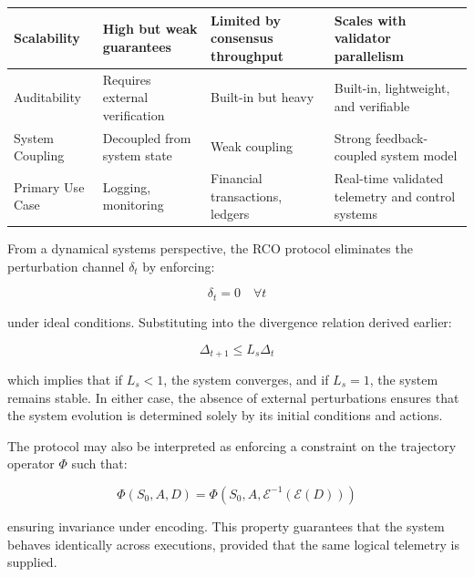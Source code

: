 \begin{table}[htbp]
\begin{tabularx}{\textwidth}{|p{3.2cm}|X|X|X|}
\hline

Scalability & High but weak guarantees & Limited by consensus throughput & Scales with validator parallelism \\

\hline

Auditability & Requires external verification & Built-in but heavy & Built-in, lightweight, and verifiable \\

\hline

System Coupling & Decoupled from system state & Weak coupling & Strong feedback-coupled system model \\

\hline

Primary Use Case & Logging, monitoring & Financial transactions, ledgers & Real-time validated telemetry and control systems \\

\hline

\end{tabularx}
\end{table}

From a dynamical systems perspective, the RCO protocol eliminates the perturbation channel $\delta_t$ by enforcing:

\begin{equation}
\delta_t = 0 \quad \forall t
\end{equation}

under ideal conditions. Substituting into the divergence relation derived earlier:

\begin{equation}
\Delta_{t+1} \leq L_s \Delta_t
\end{equation}

which implies that if $L_s < 1$, the system converges, and if $L_s = 1$, the system remains stable. In either case, the absence of external perturbations ensures that the system evolution is determined solely by its initial conditions and actions.

The protocol may also be interpreted as enforcing a constraint on the trajectory operator $\Phi$ such that:

\begin{equation}
\Phi(S_0, A, D) = \Phi(S_0, A, \mathcal{E}^{-1}(\mathcal{E}(D)))
\end{equation}

ensuring invariance under encoding. This property guarantees that the system behaves identically across executions, provided that the same logical telemetry is supplied.

